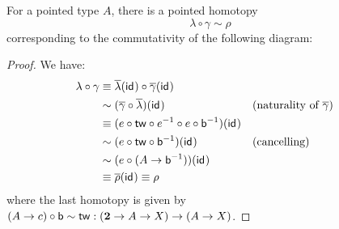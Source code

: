 \documentclass{article}
\newcommand{\smsh}{\wedge}
\renewcommand{\o}{\ensuremath{\circ}}
\newcommand{\sy}{^{-1}}
\newcommand{\rhobar}{\overline{\rho}}
\newcommand{\lambdabar}{\overline{\lambda}}
\newcommand{\gammabar}{\overline{\gamma}}
\newcommand{\two}{\mathsf{b}}
\newcommand{\twist}{\mathsf{tw}}
\begin{document}
\begin{thm}\label{thm:smash-braiding-unitors}
	For a pointed type $A$, there is a pointed homotopy
	\[\lambda \o \gamma \sim \rho\]
	corresponding to the commutativity of the following diagram:
	\begin{center}
	\end{center}
\end{thm}
\begin{proof}
	We have:
	\begin{align*}
		\lambda \o \gamma
		&\judgeq \lambdabar(\idfunc) \o \gammabar(\idfunc)\\
		&\sim (\gammabar \o \lambdabar)(\idfunc) &&\text{(naturality of $\gammabar$)}\\
		&\judgeq (e \o \twist \o e\sy \o e \o \two\sy)(\idfunc)\\
		&\sim (e \o \twist \o \two\sy)(\idfunc) &&\text{(cancelling)}\\
		&\sim (e \o (A \to \two\sy))(\idfunc)\\
		&\judgeq \rhobar(\idfunc) \judgeq \rho
	\end{align*}		
	where the last homotopy is given by $(A \to c) \o \two \sim \twist : (\bool \to A \to X) \to (A \to X)$.
\end{proof}
\end{document}
